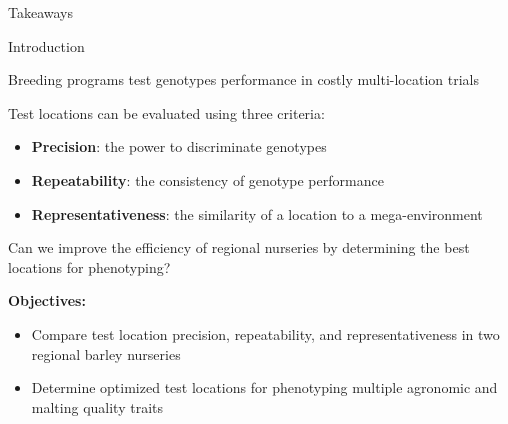 \documentclass[final]{beamer}
\newlength{\onecolwid}
\begin{document}
\begin{frame}[t]
\begin{columns}[t]
\begin{column}{\onecolwid}
\begin{alertblock}{\Large{Takeaways}}
\end{alertblock}


\begin{block}{Introduction}

Breeding programs test genotypes performance in costly multi-location trials

\vspace{0.5cm}

Test locations can be evaluated using three criteria\cite{Yan2011}:
\begin{itemize}
  \item \textbf{Precision}: the power to discriminate genotypes
  \item \textbf{Repeatability}: the consistency of genotype performance
  \item \textbf{Representativeness}: the similarity of a location to a mega-environment
\end{itemize}

\vspace{0.5cm}

Can we improve the efficiency of regional nurseries by determining the best locations for phenotyping?

\vspace{0.5cm}

\textbf{Objectives:}
\begin{itemize}
  \item Compare test location precision, repeatability, and representativeness in two regional barley nurseries
  \item Determine optimized test locations for phenotyping multiple agronomic and malting quality traits
\end{itemize}


\end{block}




\end{column}
\end{columns}
\end{frame}
\end{document}
